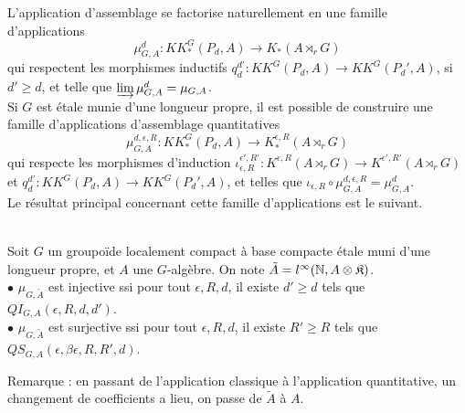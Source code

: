 L'application d'assemblage se factorise naturellement en une famille d'applications 
\[\mu^d_{G,A} :KK_*^G(P_d,A) \rightarrow K_*(A\rtimes_r G)\]
qui respectent les morphismes inductifs $q_d^{d'}:KK^G(P_d,A)\rightarrow KK^G(P_d',A)$, si $d'\geq d$, et telle que $\varinjlim \mu^d_{G,A}=\mu_{G,A}$.\\

Si $G$ est étale munie d'une longueur propre, il est possible de construire une famille d'applications d'assemblage quantitatives
\[\mu^{d,\epsilon,R}_{G,A} :KK_*^G(P_d,A) \rightarrow K^{\epsilon,R}_*(A\rtimes_r G)\]
qui respecte les morphismes d'induction $\iota_{\epsilon,R}^{\epsilon',R'} :K^{\epsilon,R}(A\rtimes_r G)\rightarrow K^{\epsilon',R'}(A\rtimes_r G)$ et $q_d^{d'}:KK^G(P_d,A)\rightarrow KK^G(P_d',A)$, et telles que 
$\iota_{\epsilon,R}\circ\mu^{d,\epsilon,R}_{G,A}=\mu^{d}_{G,A}  $.\\

Le résultat principal concernant cette famille d'applications est le suivant. 

\begin{thm}\ \\
Soit $G$ un groupoïde localement compact à base compacte étale muni d'une longueur propre, et $A$ une $G$-algèbre. On note $\tilde A=l^\infty(\mathbb N,A\otimes \mathfrak K)$.\\
$\bullet$ $\mu_{G,\tilde A}$ est injective ssi pour tout $\epsilon,R,d$, il existe $d'\geq d$ tels que $QI_{G,A}(\epsilon,R,d,d')$.\\
$\bullet$ $\mu_{G,\tilde A}$ est surjective ssi pour tout $\epsilon,R,d$, il existe $R'\geq R$ tels que $QS_{G,A}(\epsilon,\beta\epsilon,R,R',d)$.
\end{thm}

Remarque : en passant de l'application classique à l'application quantitative, un changement de coefficients a lieu, on passe de $\tilde A$ à $A$.




















